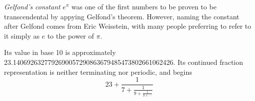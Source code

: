 \documentclass[12pt]{article}
\begin{document}
{\em Gelfond's constant} $e^\pi$ was one of the first numbers to be proven to be transcendental by appying Gelfond's theorem. However, naming the constant after Gelfond comes from Eric Weisstein, with many people preferring to refer to it simply as $e$ to the power of $\pi$.

Its value in base 10 is approximately 23.1406926327792690057290863679485473802661062426. Its continued fraction representation is neither terminating nor periodic, and begins $$23 + \frac{1}{7 + \frac{1}{9 + \frac{1}{3 + \, \cdots}}}$$
\end{document}
